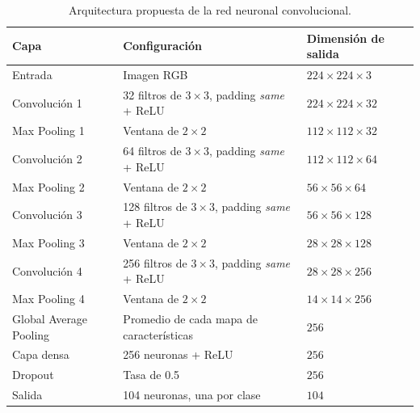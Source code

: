 \begin{table}[htbp]
    \centering
    \caption{Arquitectura propuesta de la red neuronal convolucional.}
    \label{tab:arquitectura_cnn}
    \small
    
    \begin{tabular}{
        p{}
        p{}
        p{}
    }
        \hline
        \textbf{Capa} 
        & \textbf{Configuración} 
        & \textbf{Dimensión de salida} \\
        \hline

        Entrada
        & Imagen RGB
        & $224 \times 224 \times 3$ \\

        Convolución 1
        & 32 filtros de $3 \times 3$, padding \textit{same} + ReLU
        & $224 \times 224 \times 32$ \\

        Max Pooling 1
        & Ventana de $2 \times 2$
        & $112 \times 112 \times 32$ \\

        Convolución 2
        & 64 filtros de $3 \times 3$, padding \textit{same} + ReLU
        & $112 \times 112 \times 64$ \\

        Max Pooling 2
        & Ventana de $2 \times 2$
        & $56 \times 56 \times 64$ \\

        Convolución 3
        & 128 filtros de $3 \times 3$, padding \textit{same} + ReLU
        & $56 \times 56 \times 128$ \\

        Max Pooling 3
        & Ventana de $2 \times 2$
        & $28 \times 28 \times 128$ \\

        Convolución 4
        & 256 filtros de $3 \times 3$, padding \textit{same} + ReLU
        & $28 \times 28 \times 256$ \\

        Max Pooling 4
        & Ventana de $2 \times 2$
        & $14 \times 14 \times 256$ \\

        Global Average Pooling
        & Promedio de cada mapa de características
        & $256$ \\

        Capa densa
        & 256 neuronas + ReLU
        & $256$ \\

        Dropout
        & Tasa de 0.5
        & $256$ \\

        Salida
        & 104 neuronas, una por clase
        & $104$ \\

        \hline
    \end{tabular}
\end{table}

